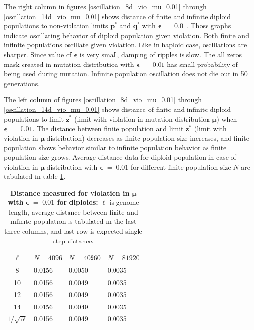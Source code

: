 \clearpage

The right column in figures \ref{oscillation_8d_vio_mu_0.01} through \ref{oscillation_14d_vio_mu_0.01} 
shows distance of finite and infinite diploid populations to non-violation limits $\bm{p^\ast}$ and $\bm{q^\ast}$ with $\bm{\epsilon} \;=\; 0.01$. 
Those graphs indicate oscillating behavior of diploid population given violation. 
Both finite and infinite populations oscillate given violation. Like in haploid case, oscillations are sharper. Since value of $\bm{\epsilon}$ 
is very small, damping of ripples is slow. The all zeros mask created in mutation distribution with $\bm{\epsilon} \;=\; 0.01$ has small 
probability of being used during mutation. Infinite population oscillation does not die out in 50 generations. 

The left column of figures \ref{oscillation_8d_vio_mu_0.01} through \ref{oscillation_14d_vio_mu_0.01} 
shows distance of finite and infinite diploid populations to limit $\bm{z^\ast}$ 
(limit with violation in mutation distribution $\bm{\mu}$) when $\bm{\epsilon} \;=\; 0.01$. 
The distance between finite population and limit $\bm{z}^\ast$ (limit with violation in $\bm{\mu}$ distribution) 
decreases as finite population size increases, 
and finite population shows behavior similar to infinite population behavior as finite population size grows. 
Average distance data for diploid population in case of violation in $\bm{\mu}$ distribution 
with $\bm{\epsilon} \;=\; 0.01$ for different finite population size $N$ are tabulated in table \ref{distanceMuDipEps0.01}.

\begin{table}[ht]
\caption[\textbf{Distance measured for violation in $\bm{\mu}$ with $\bm{\epsilon} \;=\; 0.01$ for diploids}]{\textbf{Distance measured for violation in $\bm{\mu}$ with $\bm{\epsilon} \;=\; 0.01$ for diploids:} $\ell$ is genome length, 
average distance between finite and infinite population is tabulated in the last three columns, and last row is expected single step distance.}
\centering
\begin{tabularx}{0.75\textwidth}{ c *{3}{X}}
\toprule
$\ell$ & $N = 4096$ & $N = 40960$ & $N = 81920$ \\
\midrule
8 & 0.0156	&  0.0050	& 0.0035 \\
10 & 0.0156	&  0.0049	& 0.0035 \\
12 & 0.0156	&  0.0049	& 0.0035 \\
14 & 0.0156	&  0.0049	& 0.0035 \\
\midrule
$1/\sqrt{N}$ & 0.0156 & 0.0049 & 0.0035 \\
\bottomrule
\end{tabularx}
\label{distanceMuDipEps0.01}
\end{table}

